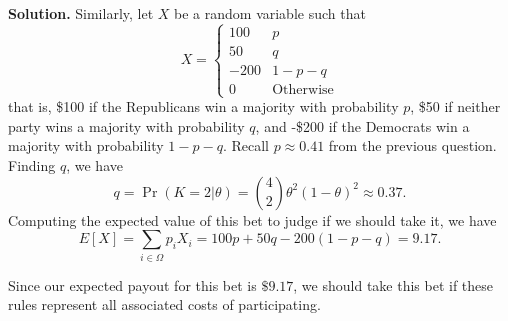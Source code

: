 \documentclass[12pt]{article}
\begin{document}
\begin{enumerate}
    \textbf{Solution.} Similarly, let $X$ be a random variable such that
    \[ X = \begin{cases}
        100 & p
        \\ 50 & q
        \\ -200 & 1-p-q
        \\ 0    & \text{Otherwise}
    \end{cases} \]
    that is, \$100 if the Republicans win a majority with probability $p$, \$50 if neither party wins a majority with probability $q$, and -\$200 if the Democrats win a majority with probability $1-p-q$.
    Recall $p\approx 0.41$ from the previous question. Finding $q$, we have
    \[ q=\Pr(K=2|\theta) = \binom{4}{2}\theta^2    (1-\theta)^{2}\approx 0.37.\]
    Computing the expected value of this bet to judge if we should take it, we have 
    \[ E[X] = \sum_{i \in \Omega} p_iX_i = 100p+50q-200(1-p-q) = 9.17. \]

    Since our expected payout for this bet is $\$9.17$, we should take this bet if these rules represent all associated costs of participating. 
\end{enumerate}
\end{document}
